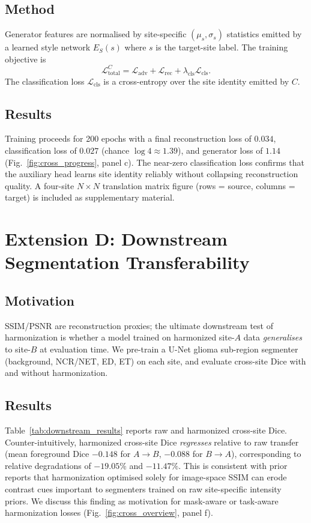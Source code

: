 \documentclass[11pt]{article}
\begin{document}
\subsection{Method}
Generator features are normalised by site-specific $(\mu_s, \sigma_s)$
statistics emitted by a learned style network $E_S(s)$ where $s$ is the
target-site label. The training objective is
\begin{equation}
  \mathcal{L}_{\mathrm{total}}^{C} =
  \mathcal{L}_{\mathrm{adv}}+\mathcal{L}_{\mathrm{rec}}+\lambda_{\mathrm{cls}}\mathcal{L}_{\mathrm{cls}}.
\end{equation}
The classification loss $\mathcal{L}_{\mathrm{cls}}$ is a cross-entropy
over the site identity emitted by $C$.

\subsection{Results}
Training proceeds for 200 epochs with a final reconstruction loss of
$0.034$, classification loss of $0.027$ (chance $\log 4{\approx}1.39$), and
generator loss of $1.14$ (Fig.~\ref{fig:cross_progress}, panel c). The
near-zero classification loss confirms that the auxiliary head learns site
identity reliably without collapsing reconstruction quality. A four-site
$N{\times}N$ translation matrix figure (rows = source, columns = target)
is included as supplementary material.

\section{Extension D: Downstream Segmentation Transferability}
\label{sec:extD}

\subsection{Motivation}
SSIM/PSNR are reconstruction proxies; the ultimate downstream test of
harmonization is whether a model trained on harmonized site-$A$ data
\emph{generalises} to site-$B$ at evaluation time. We pre-train a U-Net
glioma sub-region segmenter (background, NCR/NET, ED, ET) on each site,
and evaluate cross-site Dice with and without harmonization.

\subsection{Results}
Table~\ref{tab:downstream_results} reports raw and harmonized cross-site
Dice. Counter-intuitively, harmonized cross-site Dice \emph{regresses}
relative to raw transfer (mean foreground Dice $-0.148$ for $A{\to}B$,
$-0.088$ for $B{\to}A$), corresponding to relative degradations of
$-19.05\%$ and $-11.47\%$. This is consistent with prior reports that
harmonization optimised solely for image-space SSIM can erode
contrast cues important to segmenters trained on raw site-specific
intensity priors. We discuss this finding as motivation for mask-aware or
task-aware harmonization losses
(Fig.~\ref{fig:cross_overview}, panel f).

\end{document}
